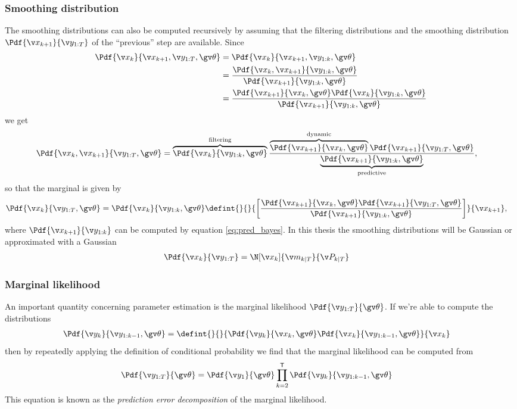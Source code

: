 \subsubsection*{Smoothing distribution}
The smoothing distributions can also be computed recursively by assuming that the filtering distributions
and the smoothing distribution $\Pdf{\x_{k+1}}{\y_{1:T}}$ of the ``previous'' step are available.
Since
\begin{align*}
	\Pdf{\xk}{\x_{k+1},\y_{1:T},\Th}&=\Pdf{\xk}{\x_{k+1},\y_{1:k},\Th}\\
	&=\frac{\Pdf{\xk,\x_{k+1}}{\y_{1:k},\Th}}{\Pdf{\x_{k+1}}{\y_{1:k},\Th}}\\
	&=\frac{\Pdf{\x_{k+1}}{\xk,\Th}\Pdf{\xk}{\y_{1:k},\Th}}{\Pdf{\x_{k+1}}{\y_{1:k},\Th}}
\end{align*}
we get
\begin{align}
	\Pdf{\xk,\x_{k+1}}{\y_{1:T},\Th}&=\overbrace{\Pdf{\xk}{\y_{1:k},\Th}}^\text{filtering}\frac{\overbrace{\Pdf{\x_{k+1}}{\xk,\Th}}^\text{dynamic}\Pdf{\x_{k+1}}{\y_{1:T},\Th}}{\underbrace{\Pdf{\x_{k+1}}{\y_{1:k},\Th}}_\text{predictive}},
	\label{eq:smooth_joint_bayes}
\end{align}
so that the marginal is given by
\begin{align}
	\Pdf{\xk}{\y_{1:T},\Th}&=\Pdf{\xk}{\y_{1:k},\Th}\defint{}{}{\left[\frac{\Pdf{\x_{k+1}}{\xk,\Th}\Pdf{\x_{k+1}}{\y_{1:T},\Th}}{\Pdf{\x_{k+1}}{\y_{1:k},\Th}}\right]}{\x_{k+1}},
	\label{eq:smooth_bayes}
\end{align}
where $\Pdf{\x_{k+1}}{\y_{1:k}}$ can be computed by equation \eqref{eq:pred_bayes}.
In this thesis the smoothing distributions will be Gaussian or approximated with a Gaussian
\begin{align}
	\Pdf{\xk}{\y_{1:T}}&=\N[\xk]{\m_{k|T}}{\P_{k|T}}
	\label{eq:smoothing_gaussian}
\end{align}

\subsubsection*{Marginal likelihood}

An important quantity concerning parameter estimation is the marginal likelihood $\Pdf{\Y}{\Th}$. 
If we're able to compute the distributions
\begin{align}
	\Pdf{\y_k}{\y_{1:k-1},\Th}&=\defint{}{}{\Pdf{\yk}{\xk,\Th}\Pdf{\xk}{\y_{1:k-1},\Th}}{\xk}
\end{align}
then by repeatedly applying the definition of conditional probability 
we find that the marginal likelihood can be computed from
\begin{align}
	\Pdf{\Y}{\Th}&=\Pdf{\y_1}{\Th}\prod_{k=2}^\tr \Pdf{\y_k}{\y_{1:k-1},\Th}
	\label{eq:lh_factorization}
\end{align}
This equation is known as the \emph{prediction error decomposition}
of the marginal likelihood.




